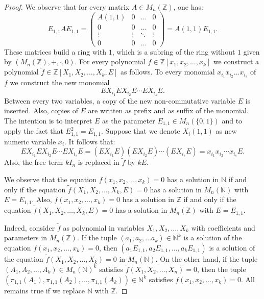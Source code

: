\documentclass{article}
\theoremstyle{plain}
\theoremstyle{definition}
\begin{document}
\begin{proof}
We observe that for every matrix $A\in M_n(\mathbb Z)$, one has:
$$
E_{1,1} A E_{1,1} =
\begin{pmatrix}
A(1,1) & 0 & \dots & 0 \\
0 & 0 & \dots & 0 \\
\vdots & \vdots & \ddots & \vdots \\
0 & 0 & \dots & 0 
\end{pmatrix} = A(1,1)E_{1,1}.
$$
These matrices build a ring with $1$, which is a subring of the ring without $1$ given by $(M_n(\mathbb Z), +, \cdot, 0)$. For every polynomial $f \in \mathbb Z[x_1, x_2, \dots, x_k]$ we construct a polynomial $\tilde f \in \mathbb Z[X_1, X_2, \dots, X_k, E]$ as follows. To every monomial $x_{i_1}x_{i_2} \dots x_{i_s}$ of $f$ we construct the new monomial $$EX_{i_1}EX_{i_2}E\cdots  EX_{i_s}E.$$ Between every two variables, a copy of the new non-commutative variable $E$ is inserted. Also, copies of $E$ are written as prefix and as suffix of the monomial. The intention is to interpret $E$ as the parameter $E_{1,1} \in M_n(\{0,1\})$ and to apply the fact that $E_{1,1}^2 = E_{1,1}$. 
Suppose that we denote $X_i(1,1)$ as new numeric variable $x_i$. It follows that: 
$$EX_{i_1}EX_{i_2}E\cdots EX_{i_s}E = (EX_{i_1}E)(EX_{i_2}E) \cdots (EX_{i_s}E) = x_{i_1}x_{i_2} \cdots x_{i_s}E.$$
Also, the free term $kI_n$ is replaced in $\tilde f$ by $kE$. 

We observe that the equation $f(x_1, x_2, \dots, x_k) = 0$ has a solution in $\mathbb N$ if and only if the equation $\tilde f(X_1, X_2, \dots, X_k, E)=0$ has a solution in $M_n(\mathbb N)$ with $E = E_{1,1}$. Also,  $f(x_1, x_2, \dots, x_k) = 0$ has a solution in $\mathbb Z$ if and only if the equation $\tilde f(X_1, X_2, \dots, X_k, E)=0$ has a solution in $M_n(\mathbb Z)$ with $E = E_{1,1}$. 

Indeed, consider $\tilde f$ as polynomial in variables $X_1, X_2, \dots, X_k$ with coefficients and parameters in $M_n(\mathbb Z)$. If the tuple $(a_1, a_2, \dots a_k) \in \mathbb N^k$ is a solution of the equation $f(x_1, x_2, \dots, x_k) = 0$, then $(a_1E_{1,1}, a_2E_{1,1}, \dots, a_kE_{1,1})$ is a solution of the equation $\tilde f(X_1, X_2, \dots,X_k) = 0$ in $M_n(\mathbb N)$. On the other hand, if the tuple $(A_1, A_2, \dots, A_k) \in M_n(\mathbb N)^k$ satisfies $\tilde f(X_1, X_2, \dots, X_n)=0$, then the tuple $(\pi_{1,1}(A_1), \pi_{1,1}(A_2), \dots, \pi_{1,1}(A_k)) \in \mathbb N^k$  satisfies $f(x_1, x_2, \dots, x_k) = 0$. All remains true if we replace $\mathbb N$ with $\mathbb Z$. 
\end{proof}
\end{document}
